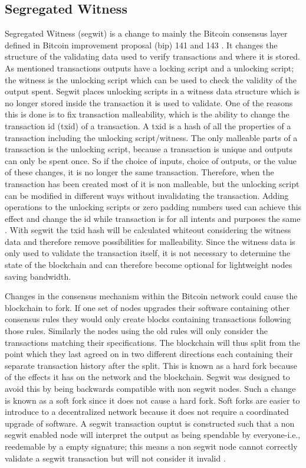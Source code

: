 \subsection{Segregated Witness}

Segregated Witness (segwit) is a change to mainly the Bitcoin consensus layer defined in Bitcoin improvement proposal (bip) 141 and 143 \cite{BIP141}\cite{BIP143}. It changes the structure of the validating data used to verify transactions and where it is stored. As mentioned transactions outputs have a locking script and a unlocking script; the witness is the unlocking script which can be used to check the validity of the output spent. Segwit places unlocking scripts in a witness data structure which is no longer stored inside the transaction it is used to validate. One of the reasons this is done is to fix transaction malleability, which is the ability to change the transaction id (txid) of a transaction. A txid is a hash of all the properties of a transaction including the unlocking script/witness. The only malleable parts of a transaction is the unlocking script, because a transaction is unique and outputs can only be spent once. So if the choice of inputs, choice of outputs, or the value of these changes, it is no longer the same transaction.
Therefore, when the transaction has been created most of it is non malleable, but the unlocking script can be modified in different ways without invalidating the transaction. Adding operations to the unlocking scripts or zero padding numbers used can achieve this effect and change the id while transaction is for all intents and purposes the same \cite{BIP62}. With segwit the txid hash will be calculated whiteout considering the witness data and therefore remove possibilities for malleability. Since the witness data is only used to validate the transaction itself, it is not necessary to determine the state of the blockchain and can therefore become optional for lightweight nodes saving bandwidth. 

Changes in the consensus mechanism within the Bitcoin network could cause the blockchain to fork. If one set of nodes upgrades their software containing other consensus rules they would only create blocks containing transactions following those rules. Similarly the nodes using the old rules will only consider the transactions matching their specifications. The blockchain will thus split from the point which they last agreed on in two different directions each containing their separate transaction history after the split. This is known as a hard fork because of the effects it has on the network and the blockchain. Segwit was designed to avoid this by being backwards compatible with non segwit nodes. Such a change is known as a soft fork since it does not cause a hard fork. Soft forks are easier to introduce to a decentralized network because it does not require a coordinated upgrade of software. A segwit transaction ouptut is constructed such that a non segwit enabled node will interpret the output as being spendable by everyone-i.e., reedemable by a empty signature; this means a non segwit node cannot correctly validate a segwit transaction but will not consider it invalid \cite{antonopoulos2017mastering}. 

